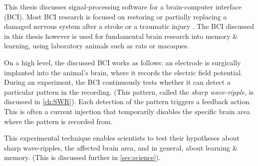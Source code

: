 
\label{sec:BCI}

This thesis discusses signal-processing software for a brain-computer interface (BCI).\footnotemark{} Most BCI research is focused on restoring or partially replacing a damaged nervous system after a stroke or a traumatic injury \cite{Krucoff2016}. The BCI discussed in this thesis however is used for fundamental brain research into memory \& learning, using laboratory animals such as rats or macaques.


On a high level, the discussed BCI works as follows: an electrode is surgically implanted into the animal's brain, where it records the electric field potential. During an experiment, the BCI continuously tests whether it can detect a particular pattern in the recording. (This pattern, called the \emph{sharp wave-ripple}, is discussed in \cref{ch:SWR}). Each detection of the pattern triggers a feedback action. This is often a current injection that temporarily disables the specific brain area where the pattern is recorded from.

This experimental technique enables scientists to test their hypotheses about sharp wave-ripples, the affected brain area, and in general, about learning \& memory. (This is discussed further in \cref{sec:science}).


